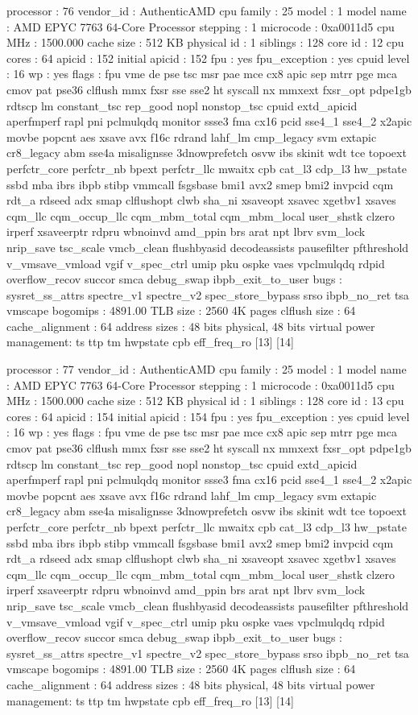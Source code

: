 processor	: 76
vendor_id	: AuthenticAMD
cpu family	: 25
model		: 1
model name	: AMD EPYC 7763 64-Core Processor
stepping	: 1
microcode	: 0xa0011d5
cpu MHz		: 1500.000
cache size	: 512 KB
physical id	: 1
siblings	: 128
core id		: 12
cpu cores	: 64
apicid		: 152
initial apicid	: 152
fpu		: yes
fpu_exception	: yes
cpuid level	: 16
wp		: yes
flags		: fpu vme de pse tsc msr pae mce cx8 apic sep mtrr pge mca cmov pat pse36 clflush mmx fxsr sse sse2 ht syscall nx mmxext fxsr_opt pdpe1gb rdtscp lm constant_tsc rep_good nopl nonstop_tsc cpuid extd_apicid aperfmperf rapl pni pclmulqdq monitor ssse3 fma cx16 pcid sse4_1 sse4_2 x2apic movbe popcnt aes xsave avx f16c rdrand lahf_lm cmp_legacy svm extapic cr8_legacy abm sse4a misalignsse 3dnowprefetch osvw ibs skinit wdt tce topoext perfctr_core perfctr_nb bpext perfctr_llc mwaitx cpb cat_l3 cdp_l3 hw_pstate ssbd mba ibrs ibpb stibp vmmcall fsgsbase bmi1 avx2 smep bmi2 invpcid cqm rdt_a rdseed adx smap clflushopt clwb sha_ni xsaveopt xsavec xgetbv1 xsaves cqm_llc cqm_occup_llc cqm_mbm_total cqm_mbm_local user_shstk clzero irperf xsaveerptr rdpru wbnoinvd amd_ppin brs arat npt lbrv svm_lock nrip_save tsc_scale vmcb_clean flushbyasid decodeassists pausefilter pfthreshold v_vmsave_vmload vgif v_spec_ctrl umip pku ospke vaes vpclmulqdq rdpid overflow_recov succor smca debug_swap ibpb_exit_to_user
bugs		: sysret_ss_attrs spectre_v1 spectre_v2 spec_store_bypass srso ibpb_no_ret tsa vmscape
bogomips	: 4891.00
TLB size	: 2560 4K pages
clflush size	: 64
cache_alignment	: 64
address sizes	: 48 bits physical, 48 bits virtual
power management: ts ttp tm hwpstate cpb eff_freq_ro [13] [14]

processor	: 77
vendor_id	: AuthenticAMD
cpu family	: 25
model		: 1
model name	: AMD EPYC 7763 64-Core Processor
stepping	: 1
microcode	: 0xa0011d5
cpu MHz		: 1500.000
cache size	: 512 KB
physical id	: 1
siblings	: 128
core id		: 13
cpu cores	: 64
apicid		: 154
initial apicid	: 154
fpu		: yes
fpu_exception	: yes
cpuid level	: 16
wp		: yes
flags		: fpu vme de pse tsc msr pae mce cx8 apic sep mtrr pge mca cmov pat pse36 clflush mmx fxsr sse sse2 ht syscall nx mmxext fxsr_opt pdpe1gb rdtscp lm constant_tsc rep_good nopl nonstop_tsc cpuid extd_apicid aperfmperf rapl pni pclmulqdq monitor ssse3 fma cx16 pcid sse4_1 sse4_2 x2apic movbe popcnt aes xsave avx f16c rdrand lahf_lm cmp_legacy svm extapic cr8_legacy abm sse4a misalignsse 3dnowprefetch osvw ibs skinit wdt tce topoext perfctr_core perfctr_nb bpext perfctr_llc mwaitx cpb cat_l3 cdp_l3 hw_pstate ssbd mba ibrs ibpb stibp vmmcall fsgsbase bmi1 avx2 smep bmi2 invpcid cqm rdt_a rdseed adx smap clflushopt clwb sha_ni xsaveopt xsavec xgetbv1 xsaves cqm_llc cqm_occup_llc cqm_mbm_total cqm_mbm_local user_shstk clzero irperf xsaveerptr rdpru wbnoinvd amd_ppin brs arat npt lbrv svm_lock nrip_save tsc_scale vmcb_clean flushbyasid decodeassists pausefilter pfthreshold v_vmsave_vmload vgif v_spec_ctrl umip pku ospke vaes vpclmulqdq rdpid overflow_recov succor smca debug_swap ibpb_exit_to_user
bugs		: sysret_ss_attrs spectre_v1 spectre_v2 spec_store_bypass srso ibpb_no_ret tsa vmscape
bogomips	: 4891.00
TLB size	: 2560 4K pages
clflush size	: 64
cache_alignment	: 64
address sizes	: 48 bits physical, 48 bits virtual
power management: ts ttp tm hwpstate cpb eff_freq_ro [13] [14]

